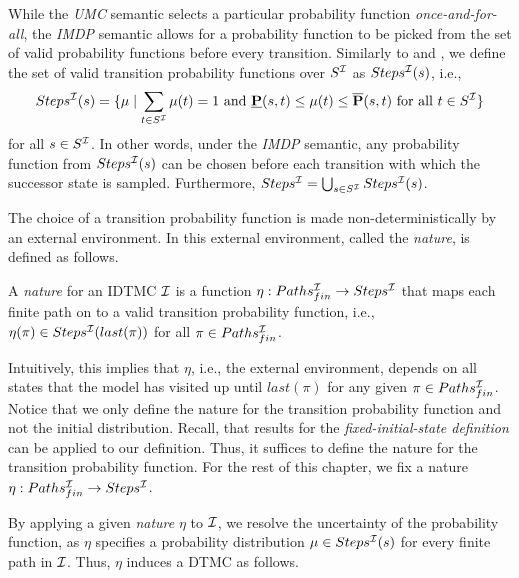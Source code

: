 While the \textit{UMC} semantic selects a particular probability function \textit{once-and-for-all}, the \textit{IMDP} semantic allows for a probability function to be picked from the set of valid probability functions before every transition.
Similarly to \cite{Model-Checking_presence_Uncertainties} and \cite{Semantics_Model-Checking_omega-Regular}, we define the set of valid transition probability functions over $S^{\mathcal{I}}$ as $Steps^{\mathcal{I}}(s)$, i.e., 
\[Steps^{\mathcal{I}}(s) = \{\mu \mid \sum_{t\in S^{\mathcal{I}}} \mu(t) = 1 \text{ and } \mathbf{\underline{P}}(s,t) \leq \mu(t) \leq \mathbf{\overline{P}}(s,t) \text{ for all } t\in S^{\mathcal{I}}\}\]
for all $s\in S^{\mathcal{I}}$.
In other words, under the \textit{IMDP} semantic, any probability function from $Steps^{\mathcal{I}}(s)$ can be chosen before each transition with which the successor state is sampled.
Furthermore, $Steps^{\mathcal{I}} = \bigcup_{s\in S^{\mathcal{I}}} Steps^{\mathcal{I}}(s)$. 

The choice of a transition probability function is made non-deterministically by an external environment.
In \cite{Badings2025} this external environment, called the \textit{nature}, is defined as follows.
\begin{definition}[Nature]\label{def:nature}
    A \textit{nature} for an IDTMC $\mathcal{I}$ is a function $\eta: Paths^{\mathcal{I}}_{fin} \rightarrow Steps^{\mathcal{I}}$ that maps each finite path on to a valid transition probability function, i.e., $\eta(\pi)\in Steps^{\mathcal{I}}(last(\pi))$ for all $\pi \in Paths_{fin}^{\mathcal{I}}$.
\end{definition}
Intuitively, this implies that $\eta$, i.e., the external environment, depends on all states that the model has visited up until $last(\pi)$ for any given $\pi \in Paths_{fin}^{\mathcal{I}}$.
Notice that we only define the nature for the transition probability function and not the initial distribution. Recall, that results for the \textit{fixed-initial-state definition} can be applied to our definition. Thus, it suffices to define the nature for the transition probability function. For the rest of this chapter, we fix a nature $\eta: Paths^{\mathcal{I}}_{fin} \rightarrow Steps^{\mathcal{I}}$.

By applying a given \textit{nature} $\eta$ to $\mathcal{I}$, we resolve the uncertainty of the probability function, as $\eta$ specifies a probability distribution $\mu \in Steps^{\mathcal{I}}(s)$ for every finite path in $\mathcal{I}$.
Thus, $\eta$ induces a DTMC as follows.

